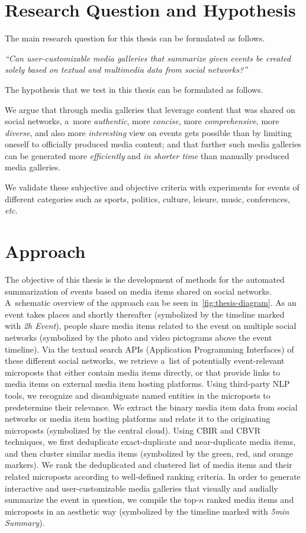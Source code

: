 \section{Research Question and Hypothesis}

The main research question for this thesis
can be formulated as follows.
 
\textit{``Can user-customizable
media galleries that summarize given events be
created solely based on textual and multimedia data
from social networks?''}

\noindent The hypothesis that we test in this thesis
can be formulated as follows.

We argue that through media galleries that leverage content
that was shared on social networks,
a~more \emph{authentic}, more \emph{concise},
more \emph{comprehensive}, more \emph{diverse},
and also more \emph{interesting}
view on events gets possible than by limiting oneself
to officially produced media content;
and that further such media galleries can be generated
more \emph{efficiently} and \emph{in shorter time}
than manually produced media galleries.

We validate these subjective and objective
criteria with experiments for events of different categories
such as sports, politics, culture, leisure,
music, conferences, \emph{etc.}

\section{Approach}

The objective of this thesis is the development
of methods for the automated summarization of events
based on media items shared on social networks.
A~schematic overview of the approach can be seen
in~\autoref{fig:thesis-diagram}.
As an event takes places and shortly thereafter
(symbolized by the timeline marked with \emph{2h Event}),
people share media items related to the event
on multiple social networks
(symbolized by the photo and video pictograms
above the event timeline).
Via the textual search APIs (Application Programming Interfaces)
of these different social networks,
we retrieve a~list of potentially event-relevant
microposts that either contain media items directly,
or that provide links to media items
on external media item hosting platforms.
Using third-party NLP tools,
we recognize and disambiguate named entities
in the microposts to predetermine their relevance.
We extract the binary media item data
from social networks or media item hosting platforms
and relate it to the originating microposts
(symbolized by the central cloud).
Using CBIR and CBVR techniques, we first deduplicate
exact-duplicate and near-duplicate media items,
and then cluster similar media items
(symbolized by the green, red, and orange markers).
We rank the deduplicated and clustered list
of media items and their related microposts
according to well-defined ranking criteria.
In order to generate interactive and user-customizable
media galleries that visually and audially summarize the
event in question, we compile the top-$n$ ranked
media items and microposts in an aesthetic way
(symbolized by the timeline marked with \emph{5min Summary}).

